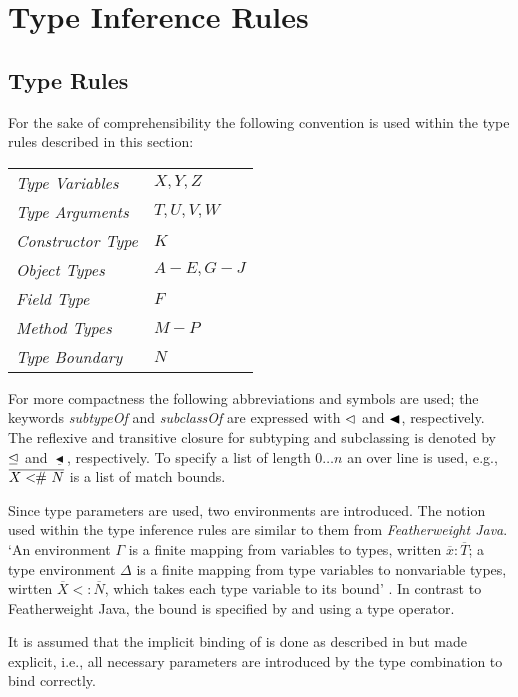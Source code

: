 \chapter{Type Inference Rules}
\label{ctr:typeRules}
\section{Type Rules}
For the sake of comprehensibility the following convention is used within
the type rules described in this section:

\begin{table}[H]
	\begin{tabular}{ll}
		\textit{Type Variables} & $X, Y, Z$ \\
		\textit{Type Arguments} & $T, U, V, W$ \\
		\textit{Constructor Type} & $K$ \\
		\textit{Object Types} & $A - E, G - J$ \\
		\textit{Field Type} & $F$ \\
		\textit{Method Types} & $M - P$ \\
		\textit{Type Boundary} & $N$
	\end{tabular}
\end{table}

For more compactness the following abbreviations and symbols are used;
the keywords \emph{subtypeOf} and \emph{subclassOf} are expressed
with $\vartriangleleft$ and $\blacktriangleleft$, respectively. The reflexive and transitive
closure for subtyping and subclassing is denoted by $\trianglelefteq$ and
$\underline{\blacktriangleleft}$, respectively.  To specify a list of
length $0\ldots n$ an over line is used, e.g., $\overline{X <\!\!\#~ N}$
is a list of match bounds.

Since type parameters are used, two environments are introduced. The
notion used within the type inference rules are similar to them from
\emph{Featherweight Java}. `An environment $\Gamma$ is a finite
mapping from variables to types, written $\overline{x}:\overline{T}$;
a type environment $\Delta$ is a finite mapping from type variables to
nonvariable types, wirtten $\overline{X}<:\overline{N}$, which takes
each type variable to its bound' \cite{igarashi_featherweight_1999}. In
contrast to Featherweight Java, the bound is specified by \match and
using a type operator.

It is assumed that the implicit binding of \mytype is done as described
in  but made explicit, i.e., all necessary
parameters are introduced by the type combination to bind \mytype
correctly.

